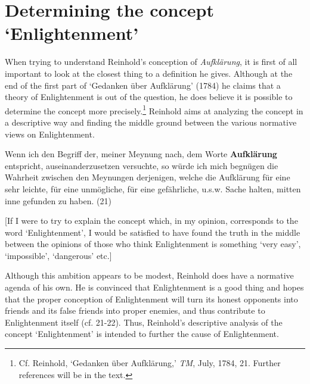 \section{Determining the concept `Enlightenment'}


When trying to understand Reinhold's conception of \textit{Aufkl\"{a}rung}, it is first of all important to look at the closest thing to a definition he gives. Although at the end of the first part of `Gedanken \"{u}ber Aufkl\"{a}rung' (1784) he claims that a theory of Enlightenment is out of the question, he does believe it is possible to determine the concept more precisely.\footnote{ Cf. Reinhold, `Gedanken \"{u}ber Aufkl\"{a}rung,' \textit{TM}, July, 1784, 21. Further references will be in the text.} Reinhold aims at analyzing the concept in a descriptive way and finding the middle ground between the various normative views on Enlightenment. 

Wenn ich den Begriff der, meiner Meynung nach, dem Worte \textbf{Aufkl\"{a}rung} entspricht, auseinanderzusetzen versuchte, so w\"{u}rde ich mich begn\"{u}gen die Wahrheit zwischen den Meynungen derjenigen, welche die Aufkl\"{a}rung f\"{u}r eine sehr leichte, f\"{u}r eine unm\"{o}gliche, f\"{u}r eine gef\"{a}hrliche, u.s.w. Sache halten, mitten inne gefunden zu haben. (21)

[If I were to try to explain the concept which, in my opinion, corresponds to the word `Enlightenment', I would be satisfied to have found the truth in the middle between the opinions of those who think Enlightenment is something `very easy', `impossible', `dangerous' etc.]

Although this ambition appears to be modest, Reinhold does have a normative agenda of his own. He is convinced that Enlightenment is a good thing and hopes that the proper conception of Enlightenment will turn its honest opponents into friends and its false friends into proper enemies, and thus contribute to Enlightenment itself (cf. 21{-}22). Thus, Reinhold's descriptive analysis of the concept `Enlightenment' is intended to further the cause of Enlightenment. 

